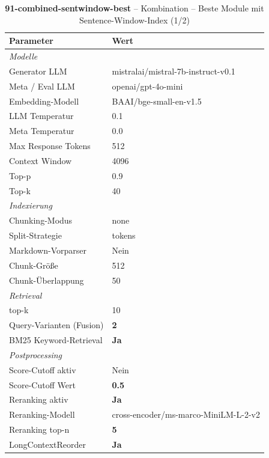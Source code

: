 \begin{table}[H]
\centering
\small
\setlength{\tabcolsep}{4pt}
\begin{tabular}{lp{8cm}}
\toprule
\textbf{Parameter} & \textbf{Wert} \\
\midrule
\multicolumn{2}{l}{\textit{Modelle}} \\
\midrule
\quad Generator LLM & mistralai/mistral-7b-instruct-v0.1 \\
\quad Meta / Eval LLM & openai/gpt-4o-mini \\
\quad Embedding-Modell & BAAI/bge-small-en-v1.5 \\
\quad LLM Temperatur & 0.1 \\
\quad Meta Temperatur & 0.0 \\
\quad Max Response Tokens & 512 \\
\quad Context Window & 4096 \\
\quad Top-p & 0.9 \\
\quad Top-k & 40 \\
\midrule
\multicolumn{2}{l}{\textit{Indexierung}} \\
\midrule
\quad Chunking-Modus & none \\
\quad Split-Strategie & tokens \\
\quad Markdown-Vorparser & Nein \\
\quad Chunk-Größe & 512 \\
\quad Chunk-Überlappung & 50 \\
\midrule
\multicolumn{2}{l}{\textit{Retrieval}} \\
\midrule
\quad top-k & 10 \\
\quad Query-Varianten (Fusion) & \textbf{2} \\
\quad BM25 Keyword-Retrieval & \textbf{Ja} \\
\midrule
\multicolumn{2}{l}{\textit{Postprocessing}} \\
\midrule
\quad Score-Cutoff aktiv & Nein \\
\quad Score-Cutoff Wert & \textbf{0.5} \\
\quad Reranking aktiv & \textbf{Ja} \\
\quad Reranking-Modell & cross-encoder/ms-marco-MiniLM-L-2-v2 \\
\quad Reranking top-n & \textbf{5} \\
\quad LongContextReorder & \textbf{Ja} \\
\bottomrule
\end{tabular}
\caption{\textbf{91-combined-sentwindow-best} -- Kombination -- Beste Module mit Sentence-Window-Index (1/2)}
\label{tab:config_91_combined_sentwindow_best_a}
\end{table}

